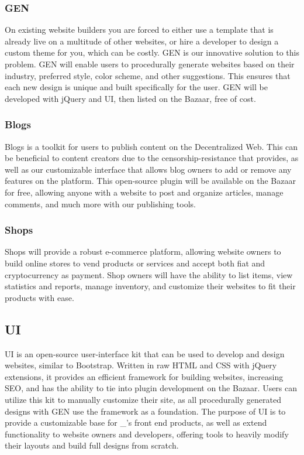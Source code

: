 \documentclass{kwp-builder}
\begin{document}
\subsubsection{\konjure GEN}

\tab On existing website builders you are forced to either use a template that is already live on a multitude of other websites, or hire a developer to design a custom theme for you, which can be costly. \konjure GEN is our innovative solution to this problem. GEN will enable users to procedurally generate websites based on their industry, preferred style, color scheme, and other suggestions. This ensures that each new design is unique and built specifically for the user. GEN will be developed with jQuery and \konjure UI, then listed on the Bazaar, free of cost.

\newpage

\subsubsection{\konjure Blogs}

\tab \konjure Blogs is a toolkit for users to publish content on the Decentralized Web. This can be beneficial to content creators due to the censorship-resistance that \konjure provides, as well as our customizable interface that allows blog owners to add or remove any features on the platform. This open-source plugin will be available on the Bazaar for free, allowing anyone with a \konjure website to post and organize articles, manage comments, and much more with our publishing tools.

\subsubsection{\konjure Shops}

\tab \konjure Shops will provide a robust e-commerce platform, allowing website owners to build online stores to vend products or services and accept both fiat and cryptocurrency as payment. Shop owners will have the ability to list items, view statistics and reports, manage inventory, and customize their websites to fit their products with ease.

\subsection{\konjure UI}

\tab \konjure UI is an open-source user-interface kit that can be used to develop and design websites, similar to Bootstrap. Written in raw HTML and CSS with jQuery extensions, it provides an efficient framework for building websites, increasing SEO, and has the ability to tie into plugin development on the Bazaar. Users can utilize this kit to manually customize their \konjure site, as all procedurally generated designs with \konjure GEN use the framework as a foundation. The purpose of \konjure UI is to provide a customizable base for \konjure\_{’}s front end products, as well as extend functionality to website owners and developers, offering tools to heavily modify their layouts and build full designs from scratch.
\end{document}
